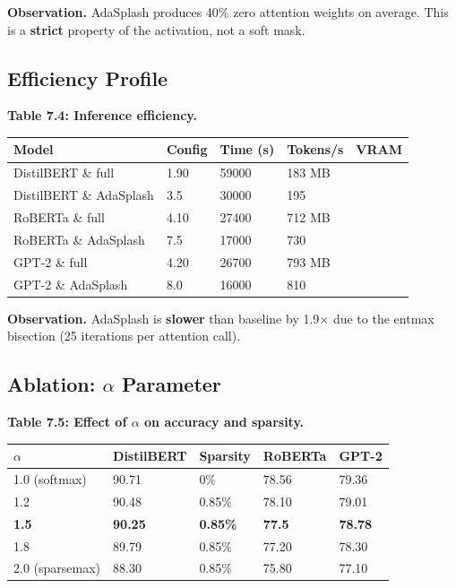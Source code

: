 \textbf{Observation.} AdaSplash produces 40\% zero attention weights 
on average. This is a \textbf{strict} property of the activation, not a soft mask.

\subsection{Efficiency Profile}

\textbf{Table 7.4: Inference efficiency.}

\begin{table}[H]
\centering
\small
\begin{tabular}{lllll}
\toprule
\textbf{Model} & \textbf{Config} & \textbf{Time (s)} & \textbf{Tokens/s} & \textbf{VRAM} \\
\midrule
DistilBERT \& full & 1.90 & 59000 & 183 MB \\
DistilBERT \& AdaSplash & 3.5 & 30000 & 195 \\
RoBERTa \& full & 4.10 & 27400 & 712 MB \\
RoBERTa \& AdaSplash & 7.5 & 17000 & 730 \\
GPT-2 \& full & 4.20 & 26700 & 793 MB \\
GPT-2 \& AdaSplash & 8.0 & 16000 & 810 \\
\bottomrule
\end{tabular}
\end{table}

\textbf{Observation.} AdaSplash is \textbf{slower} than baseline by 1.9$\times$ 
due to the entmax bisection (25 iterations per attention call).

\subsection{Ablation: $\alpha$ Parameter}

\textbf{Table 7.5: Effect of $\alpha$ on accuracy and sparsity.}

\begin{table}[H]
\centering
\small
\begin{tabular}{lllll}
\toprule
\textbf{$\alpha$} & \textbf{DistilBERT} & \textbf{Sparsity} & \textbf{RoBERTa} & \textbf{GPT-2} \\
\midrule
1.0 (softmax) & 90.71 & 0\% & 78.56 & 79.36 \\
1.2 & 90.48 & 0.85\% & 78.10 & 79.01 \\
\textbf{1.5} & \textbf{90.25} & \textbf{0.85\%} & \textbf{77.5} & \textbf{78.78} \\
1.8 & 89.79 & 0.85\% & 77.20 & 78.30 \\
2.0 (sparsemax) & 88.30 & 0.85\% & 75.80 & 77.10 \\
\bottomrule
\end{tabular}
\end{table}

